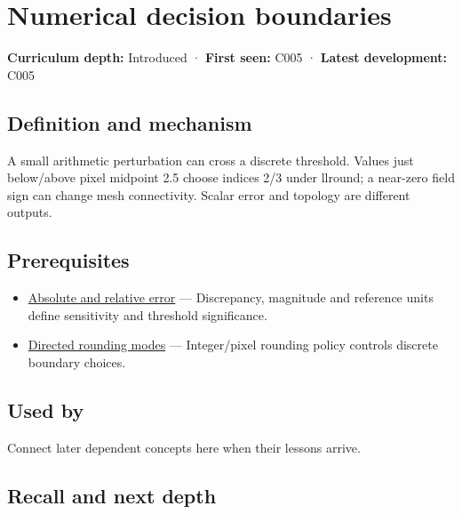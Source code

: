 \hypertarget{appendix-c80db39080be}{}\label{referencestart:appendix-c80db39080be}
\section{Numerical decision boundaries}\label{appendix-c80db39080be-numerical-decision-boundaries}

\textbf{Curriculum depth:} Introduced · \textbf{First seen:} C005 · \textbf{Latest development:} C005

\begin{allmightroledefinition}

\subsection{Definition and mechanism}\label{appendix-c80db39080be-definition-and-mechanism}

A small arithmetic perturbation can cross a discrete threshold. Values just below/above pixel midpoint 2.5 choose indices 2/3 under llround; a near-zero field sign can change mesh connectivity. Scalar error and topology are different outputs.

\end{allmightroledefinition}

\subsection{Prerequisites}\label{appendix-c80db39080be-prerequisites}

\begin{itemize}
\tightlist
\item
  \hyperref[appendix-3ae74e89b4e6]{Absolute and relative error} --- Discrepancy, magnitude and reference units define sensitivity and threshold significance.
\item
  \hyperref[appendix-637d164ae5ca]{Directed rounding modes} --- Integer/pixel rounding policy controls discrete boundary choices.
\end{itemize}

\subsection{Used by}\label{appendix-c80db39080be-used-by}

Connect later dependent concepts here when their lessons arrive.

\subsection{Recall and next depth}\label{appendix-c80db39080be-recall-and-next-depth}

